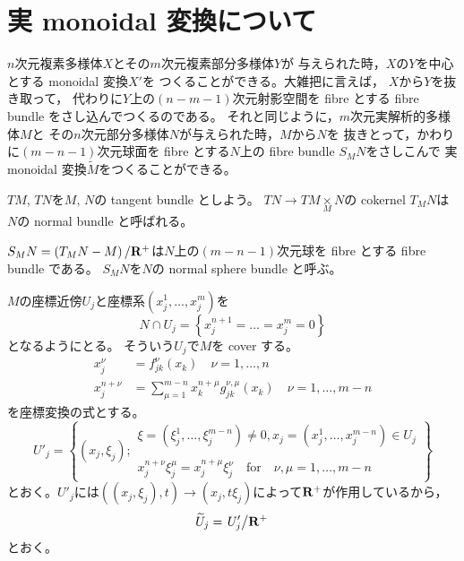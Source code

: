 \setcounter{section}{5}
\section{実 monoidal 変換について}\label{a6}

\(n\)次元複素多様体\(X\)とその\(m\)次元複素部分多様体\(Y\)が
与えられた時，\(X\)の\(Y\)を中心とする monoidal 変換\(X'\)を
つくることができる。大雑把に言えば，
\(X\)から\(Y\)を抜き取って，
代わりに\(Y\)上の\((n-m-1)\)次元射影空間を 
fibre とする fibre bundle をさし込んでつくるのである。
それと同じように，\(m\)次元実解析的多様体\(M\)と
その\(n\)次元部分多様体\(N\)が与えられた時，\(M\)から\(N\)を
抜きとって，かわりに\((m-n-1)\)次元球面を fibre とする\(N\)上の 
fibre bundle \(S_{M}N\)をさしこんで
実 monoidal 変換\(\widetilde{M}\)をつくることができる。

\(TM\), \(TN\)を\(M\), \(N\)の tangent bundle としよう。
\(
    TN\to TM\mathbin{\mathop{\times}\limits_M}N
\)の cokernel \(T_{M}N\)は\(N\)の normal bundle と呼ばれる。

\(
    S_{M}N=\left(T_{M}N-M\right)/\mathbf{R}^+
\)は\(N\)上の\((m-n-1)\)次元球を fibre とする fibre bundle である。
\(S_{M}N\)を\(N\)の normal sphere bundle と呼ぶ。

\(M\)の座標近傍\(U_j\)と座標系\(
    \left(x_{j}^{1},\dots,x_{j}^{m}\right)
\)を
\[
    N\cap U_j=
    \left\{x_{j}^{n+1}=\dots=x_{j}^{m}=0\right\}
\]
となるようにとる。
そういう\(U_j\)で\(M\)を cover する。
\begin{align}
    x_{j}^{\nu}
    &=f^{\nu}_{jk}(x_k)\quad\nu=1,\dots,n\label{eq-a61}\\
    x_{j}^{n+\nu}
    &=\sum_{\mu=1}^{m-n}x_{k}^{n+\mu}
    g^{\nu,\mu}_{jk}(x_k)\quad\nu=1,\dots,m-n\label{eq-a62}
\end{align}
を座標変換の式とする。
\[
    U'_{j}=\left\{
        (x_j,\xi_j);\begin{array}{l}
            \xi=\left(\xi_{j}^{1},\dots,\xi_{j}^{m-n}\right)\ne0, 
            x_j=\left(x_{j}^{1},\dots,x_{j}^{m-n}\right)\in 
            U_j\\ \\
            x_{j}^{n+\nu}\xi_{j}^{\mu} = x_{j}^{n+\mu} \xi_{j}^{\nu} 
            \quad\text{for}\quad 
            \nu,\mu = 1,\ldots,m-n     
        \end{array}
    \right\}
\]
とおく。\(U'_{j}\)には\(
    \left(\left(x_j,\xi_j\right),t\right)
    \to \left(x_j,t\xi_j\right)
\)によって\(\mathbf{R}^+\)が作用しているから，
\[
    \widetilde{U}_j=\left.U'_j\middle/\mathbf{R}^+\right.
\]
とおく。

